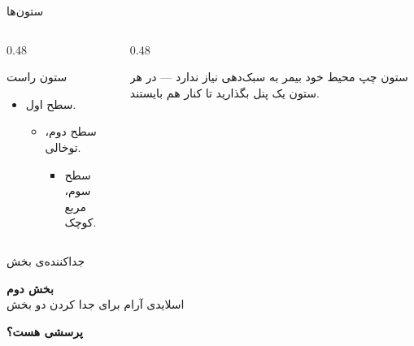 \begin{frame}{ستون‌ها}
    \begin{columns}[T]
        \begin{column}{0.48\textwidth}
            \begin{panel}{ستون راست}
                \begin{itemize}
                    \item سطح اول.
                    \begin{itemize}
                        \item سطح دوم، توخالی.
                        \begin{itemize}
                            \item سطح سوم، مربع کوچک.
                        \end{itemize}
                    \end{itemize}
                \end{itemize}
            \end{panel}
        \end{column}
        \begin{column}{0.48\textwidth}
            \begin{panel}{ستون چپ}
                محیط  خود بیمر به سبک‌دهی نیاز ندارد — در
                هر ستون یک پنل بگذارید تا کنار هم بایستند.
            \end{panel}
        \end{column}
    \end{columns}
\end{frame}

\begin{frame}{جداکننده‌ی بخش}
    \vfill
    \begin{center}
        {\titlefont \Huge \bfseries \color{ink} بخش دوم}\\[0.3cm]
        {\color{gray} اسلایدی آرام برای جدا کردن دو بخش}
    \end{center}
    \vfill
\end{frame}

\begin{frame}[plain]
    \vfill
    \begin{center}
        {\titlefont \Huge \bfseries \color{accent} پرسشی هست؟}
    \end{center}
    \vfill
\end{frame}
